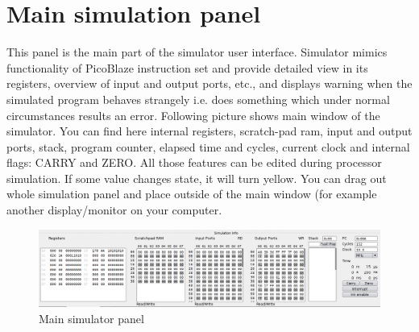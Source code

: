 \section{Main simulation panel}
    This panel is the main part of the simulator user interface. Simulator mimics functionality of PicoBlaze instruction
    set and provide detailed view in its registers, overview of input and output ports, etc., and displays warning when
    the simulated program behaves strangely i.e. does something which under normal circumstances results an error.
    Following picture shows main window of the simulator. You can find here internal registers, scratch-pad ram, input
    and output ports, stack, program counter, elapsed time and cycles, current clock and internal flags: CARRY and ZERO.
    All those features can be edited during processor simulation. If some value changes state, it will turn yellow. You
    can drag out whole simulation panel and place outside of the main window (for example another display/monitor on
    your computer.

   \begin{figure}[h!]
        \centering
        \includegraphics[width=\textwidth]{img/bottom_panel.png}
        \caption{Main simulator panel}
    \end{figure}

